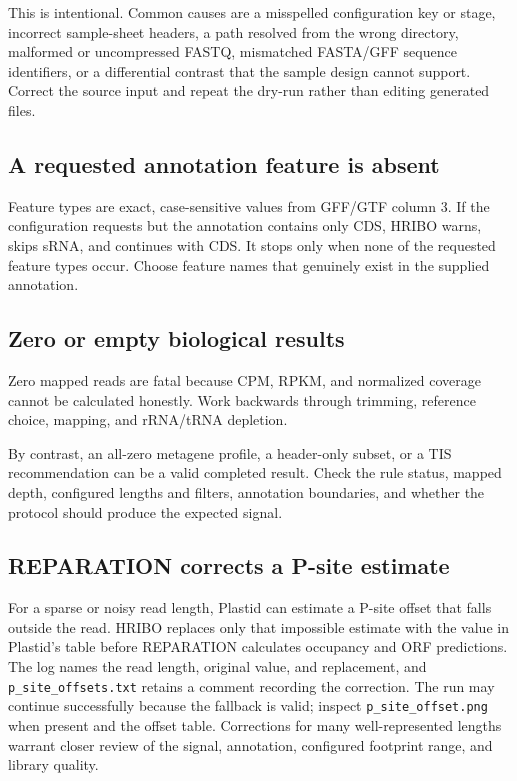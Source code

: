 \documentclass[11pt,a4paper]{article}
\newcommand{\setting}[1]{\texttt{\detokenize{#1}}}
\newcommand{\file}[1]{\nolinkurl{#1}}
\begin{document}
This is intentional. Common causes are a misspelled configuration key or stage,
incorrect sample-sheet headers, a path resolved from the wrong directory,
malformed or uncompressed FASTQ, mismatched FASTA/GFF sequence identifiers,
or a differential contrast that the sample design cannot support. Correct the
source input and repeat the dry-run rather than editing generated files.

\subsection{A requested annotation feature is absent}

Feature types are exact, case-sensitive values from GFF/GTF column 3. If the
configuration requests \setting{["CDS", "sRNA"]} but the annotation contains
only CDS, HRIBO warns, skips sRNA, and continues with CDS. It stops only when
none of the requested feature types occur. Choose feature names that genuinely
exist in the supplied annotation.

\subsection{Zero or empty biological results}

Zero mapped reads are fatal because CPM, RPKM, and normalized coverage cannot
be calculated honestly. Work backwards through trimming, reference choice,
mapping, and rRNA/tRNA depletion.

By contrast, an all-zero metagene profile, a header-only subset, or a
\setting{confidence: none} TIS recommendation can be a valid completed result.
Check the rule status, mapped depth, configured lengths and filters, annotation
boundaries, and whether the protocol should produce the expected signal.

\subsection{REPARATION corrects a P-site estimate}

For a sparse or noisy read length, Plastid can estimate a P-site offset that
falls outside the read. HRIBO replaces only that impossible estimate with the
\setting{default} value in Plastid's table before REPARATION calculates
occupancy and ORF predictions. The log names the read length, original value,
and replacement, and \file{p_site_offsets.txt} retains a comment recording the
correction. The run may continue successfully because the fallback is valid;
inspect \file{p_site_offset.png} when present and the offset table. Corrections
for many well-represented lengths warrant closer review of the signal,
annotation, configured footprint range, and library quality.
\end{document}
